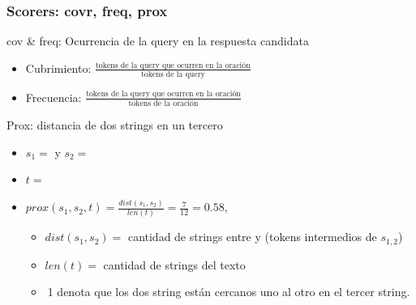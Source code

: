 \begin{frame}
\frametitle{Scorers: covr, freq, prox}
  \begin{block}{cov \& freq: Ocurrencia de la query en la respuesta candidata}
  \begin{itemize}
      \item Cubrimiento: $\frac{\text{tokens de la query que ocurren en la oración}}{\text{tokens de la query}}$
      \item Frecuencia: $\frac{\text{tokens de la query que ocurren en la oración}}{\text{tokens de la oración}}$
  \end{itemize}
  \end{block}
  \begin{alertblock}{Prox: distancia de dos strings en un tercero}
  \begin{itemize}
      \item $s_1=$ y $s_2=$
      \item $t=$
      \item $prox(s_1, s_2, t)= \frac{dist(s_1, s_2)}{len(t)} = \frac{7}{12} = 0.58 $, 
      \begin{itemize}
          \item $dist(s_1, s_2)=$ cantidad de strings entre  y  (tokens intermedios de $s_{1,2}$)
          \item $len(t)=$ cantidad de strings del texto
          \item $~$1 denota que los dos string están cercanos uno al otro en el tercer string.
      \end{itemize}
  \end{itemize}
  \end{alertblock}
\end{frame}




